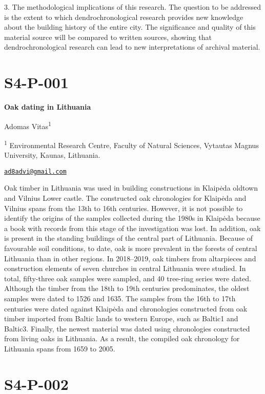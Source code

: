 \documentclass[
]{book}
\begin{document}
3. The methodological implications of this research. The question to be addressed is the extent to which dendrochronological research provides new knowledge about the building history of the entire city. The significance and quality of this material source will be compared to written sources, showing that dendrochronological research can lead to new interpretations of archival material.

\hypertarget{s4-p-001}{%
\section*{S4-P-001}\label{s4-p-001}}

\textbf{Oak dating in Lithuania}

Adomas Vitas\textsuperscript{1}

\textsuperscript{1} Environmental Research Centre, Faculty of Natural Sciences, Vytautas Magnus University, Kaunas, Lithuania.

\href{mailto:ad8advi@gmail.com}{\nolinkurl{ad8advi@gmail.com}}

Oak timber in Lithuania was used in building constructions in Klaipėda oldtown and Vilnius Lower castle. The constructed oak chronologies for Klaipėda and Vilnius spans from the 13th to 16th centuries. However, it is not possible to identify the origins of the samples collected during the 1980s in Klaipėda because a book with records from this stage of the investigation was lost. In addition, oak is present in the standing buildings of the central part of Lithuania. Because of favourable soil conditions, to date, oak is more prevalent in the forests of central Lithuania than in other regions. In 2018--2019, oak timbers from altarpieces and construction elements of seven churches in central Lithuania were studied. In total, fifty-three oak samples were sampled, and 40 tree-ring series were dated. Although the timber from the 18th to 19th centuries predominates, the oldest samples were dated to 1526 and 1635. The samples from the 16th to 17th centuries were dated against Klaipėda and chronologies constructed from oak timber imported from Baltic lands to western Europe, such as Baltic1 and Baltic3. Finally, the newest material was dated using chronologies constructed from living oaks in Lithuania. As a result, the compiled oak chronology for Lithuania spans from 1659 to 2005.

\hypertarget{s4-p-002}{%
\section*{S4-P-002}\label{s4-p-002}}
\end{document}

